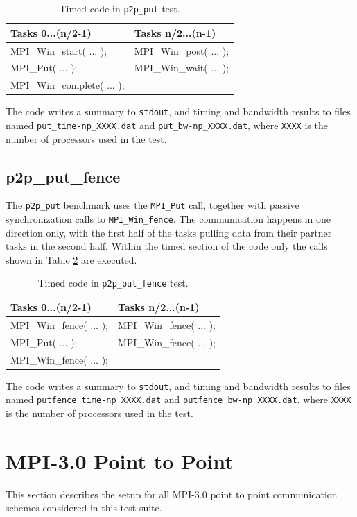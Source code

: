 \documentclass[10pt,a4paper]{report}
\begin{document}
\begin{table}[ht]
\centering
\caption{Timed code in \texttt{p2p\_put} test.}
\label{tab:put}
\begin{tabular}{|l|l|}
\hline
\bf{Tasks 0...(n/2-1)}	   & \bf{Tasks n/2...(n-1)}\\\hline
MPI\_Win\_start( ... );    & MPI\_Win\_post( ... );\\
MPI\_Put( ... );           & MPI\_Win\_wait( ... );\\
MPI\_Win\_complete( ... ); & \\\hline
\end{tabular}
\end{table}

The code writes a summary to \verb+stdout+, and timing and bandwidth results to files named \verb+put_time-np_XXXX.dat+ and \verb+put_bw-np_XXXX.dat+, where \verb+XXXX+ is the number of processors used in the test.

\FloatBarrier
\subsection{p2p\_put\_fence}
The \verb+p2p_put+ benchmark uses the \verb+MPI_Put+ call, together with passive synchronization calls to \verb+MPI_Win_fence+. The communication happens in one direction only, with the first half of the tasks pulling data from their partner tasks in the second half. Within the timed section of the code only the calls shown in Table \ref{tab:put_fence} are executed.

\begin{table}[ht]
\centering
\caption{Timed code in \texttt{p2p\_put\_fence} test.}
\label{tab:put_fence}
\begin{tabular}{|l|l|}
\hline
\bf{Tasks 0...(n/2-1)}	   & \bf{Tasks n/2...(n-1)}\\\hline
MPI\_Win\_fence( ... );    & MPI\_Win\_fence( ... );\\
MPI\_Put( ... );           & MPI\_Win\_fence( ... );\\
MPI\_Win\_fence( ... ); & \\\hline
\end{tabular}
\end{table}

The code writes a summary to \verb+stdout+, and timing and bandwidth results to files named \verb+putfence_time-np_XXXX.dat+ and \verb+putfence_bw-np_XXXX.dat+, where \verb+XXXX+ is the number of processors used in the test.

\FloatBarrier
\section{MPI-3.0 Point to Point}
This section describes the setup for all MPI-3.0 point to point communication schemes considered in this test suite.
\end{document}
